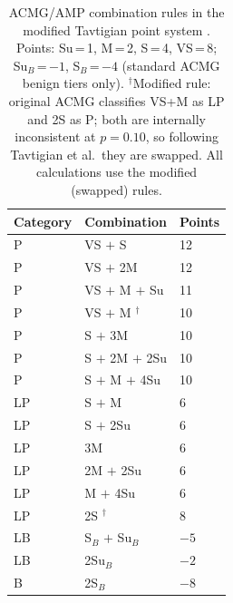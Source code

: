 \documentclass[11pt]{article}
\begin{document}
\begin{table}[h]
\centering
\caption{ACMG/AMP combination rules in the modified Tavtigian point system
         \cite{tavtigian2018modeling, Tavtigian2020}.
         Points: Su\,=\,1, M\,=\,2, S\,=\,4, VS\,=\,8;
         Su$_B$\,=\,$-1$, S$_B$\,=\,$-4$ (standard ACMG benign tiers only).
         $^\dagger$Modified rule: original ACMG classifies VS+M as LP and
         2S as P; both are internally inconsistent at $p=0.10$, so following
         Tavtigian et al.\ they are swapped. All calculations use the
         modified (swapped) rules.}
\label{tab:rules}
\begin{tabular}{lll}
\toprule
Category & Combination & Points \\
\midrule
P  & VS $+$ S                                          & 12 \\
P  & VS $+$ 2M                                         & 12 \\
P  & VS $+$ M $+$ Su                                   & 11 \\
P  & VS $+$ M $^\dagger$                               & 10 \\
P  & S $+$ 3M                                          & 10 \\
P  & S $+$ 2M $+$ 2Su                                  & 10 \\
P  & S $+$ M $+$ 4Su                                   & 10 \\
\midrule
LP & S $+$ M                                           &  6 \\
LP & S $+$ 2Su                                         &  6 \\
LP & 3M                                                &  6 \\
LP & 2M $+$ 2Su                                        &  6 \\
LP & M $+$ 4Su                                         &  6 \\
LP & 2S $^\dagger$                                     &  8 \\
\midrule
LB & S$_B$ $+$ Su$_B$                                  & $-5$ \\
LB & 2Su$_B$                                           & $-2$ \\
B  & 2S$_B$                                            & $-8$ \\
\bottomrule
\end{tabular}
\end{table}
\end{document}
